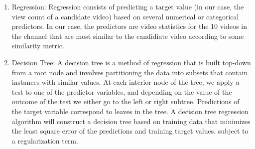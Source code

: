 \documentclass[12pt]{article}
\theoremstyle{definition}
\theoremstyle{remark}
\begin{document}
\begin{enumerate}
\item Regression: Regression consists of predicting a target value (in our case,
  the view count of a candidate video) based on several numerical or categorical
  predictors. In our case, the predictors are video statistics for the 10 videos
  in the channel that are most similar to the candidiate video according to some
  similarity metric.
\item Decision Tree: A decision tree is a method of regression that is built
  top-down from a root node and involves partitioning the data into subsets that
  contain instances with similar values. At each interior node of the tree, we
  apply a test to one of the predictor variables, and depending on the value of
  the outcome of the test we either go to the left or right subtree. Predictions
  of the target variable correspond to leaves in the tree. A decision tree
  regression algorithm will construct a decision tree based on training data
  that minimizes the least square error of the predictions and training target
  values, subject to a regularization term.

\end{enumerate}
\end{document}
